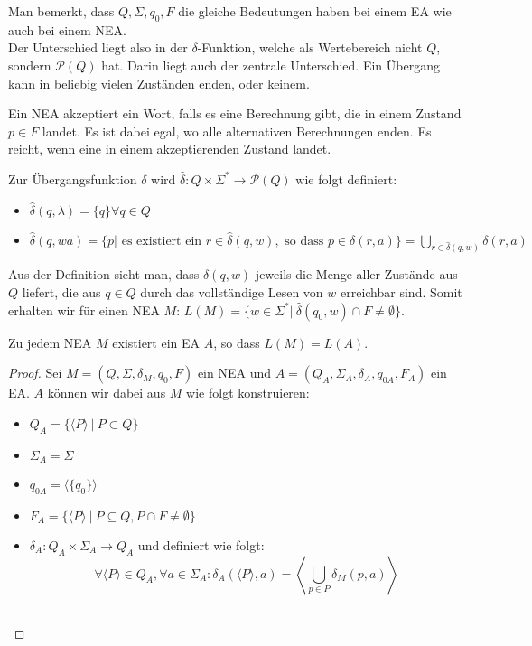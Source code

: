 Man bemerkt, dass $Q, \Sigma, q_0, F$ die gleiche Bedeutungen haben bei einem EA wie auch bei einem NEA.\\

Der Unterschied liegt also in der $\delta$-Funktion, welche als Wertebereich nicht $Q$, sondern $\mathcal{P}(Q)$ hat. Darin liegt auch der zentrale Unterschied. Ein Übergang kann in beliebig vielen Zuständen enden, oder keinem.

Ein NEA akzeptiert ein Wort, falls es eine Berechnung gibt, die in einem Zustand $p \in F$ landet. Es ist dabei egal, wo alle alternativen Berechnungen enden. Es reicht, wenn eine in einem akzeptierenden Zustand landet.\\

\begin{definition}
Zur Übergangsfunktion $\delta$ wird $\hat\delta: Q \times \Sigma^* \to \mathcal{P}(Q)$ wie folgt definiert:
\begin{itemize}
  \item $\hat\delta(q, \lambda) = \{q\} \forall q \in Q$
  \item $\hat\delta(q, wa) = \{p | \text{ es existiert ein } r \in \hat\delta(q, w), \text{ so dass } p \in \delta(r, a)\} = \bigcup_{r \in \hat\delta(q, w)} \delta(r, a)$\\
\end{itemize}

\end{definition}

Aus der Definition sieht man, dass $\delta(q, w)$ jeweils die Menge aller Zustände aus $Q$ liefert, die aus $q \in Q$ durch das vollständige Lesen von $w$ erreichbar sind. Somit erhalten wir für einen NEA $M$: $L(M) = \{ w \in \Sigma^* |\ \hat\delta(q_0, w) \cap F \not= \emptyset \}$.\\

\begin{satz}
Zu jedem NEA \( M \) existiert ein EA \( A \), so dass \(L(M) = L(A)\).
\end{satz}

\begin{proof}
Sei \( M = (Q, \Sigma, \delta_M, q_0, F) \) ein NEA und \( A = (Q_A, \Sigma_A, \delta_A, q_{0A}, F_A) \) ein EA. \(A\) können wir dabei aus \(M\) wie folgt konstruieren:
\begin{itemize}
  \item \(Q_A = \{ \langle P \rangle \ |\ P \subset Q \}\)
  \item \(\Sigma_A = \Sigma\)
  \item \(q_{0A} = \langle \{q_0\} \rangle\)
  \item \(F_A = \{ \langle P \rangle \ |\ P \subseteq Q, P \cap F \not= \emptyset \}\)
  \item \( \delta_A: Q_A \times \Sigma_A \to Q_A \) und definiert wie folgt: \[ \forall \langle P \rangle \in Q_A, \forall a \in \Sigma_A: \delta_A(\langle P \rangle, a) = \left\langle \bigcup_{p \in P} \delta_M (p, a) \right\rangle
  \]\\
\end{itemize}

\end{proof}